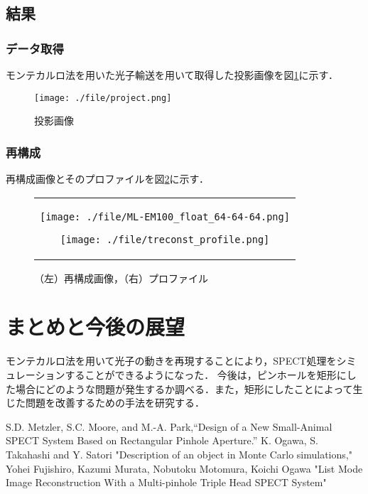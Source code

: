 \documentclass[dvipdfmx,autodetect-engine,twocolumn,10pt]{jsarticle}%
\begin{document}
\subsection{結果}
\subsubsection{データ取得}
モンテカルロ法を用いた光子輸送を用いて取得した投影画像を図\ref{proj}に示す．
\begin{figure}[htbp]
  \begin{center}
    \texttt{[image: ./file/project.png]}\\
    \caption{投影画像}
    \label{proj}
  \end{center}
\end{figure}

\subsubsection{再構成}
再構成画像とそのプロファイルを図\ref{reconst}に示す．
\begin{figure}[htbp]
  \begin{center}
    \begin{tabular}{c}
      \begin{minipage}{0.5\hsize}
        \begin{center}
          \texttt{[image: ./file/ML-EM100\_float\_64-64-64.png]}
        \end{center}
      \end{minipage}
      \begin{minipage}{0.5\hsize}
        \begin{center}
          \texttt{[image: ./file/treconst\_profile.png]}
        \end{center}
      \end{minipage}
    \end{tabular}
  \caption{（左）再構成画像，（右）プロファイル}
  \label{reconst}
  \end{center}
\end{figure}
\section{まとめと今後の展望}
モンテカルロ法を用いて光子の動きを再現することにより，SPECT処理をシミュレーションすることができるようになった．
今後は，ピンホールを矩形にした場合にどのような問題が発生するか調べる．また，矩形にしたことによって生じた問題を改善するための手法を研究する．

\begin{thebibliography}{9}
   S.D. Metzler, S.C. Moore, and M.-A. Park,“Design of a New Small-Animal SPECT System Based on Rectangular Pinhole Aperture.”
   K. Ogawa, S. Takahashi and Y. Satori "Description of an object in Monte Carlo simulations,"
   Yohei Fujishiro, Kazumi Murata, Nobutoku Motomura, Koichi Ogawa "List Mode Image Reconstruction With a Multi-pinhole Triple Head SPECT System"
\end{thebibliography}
\end{document}
